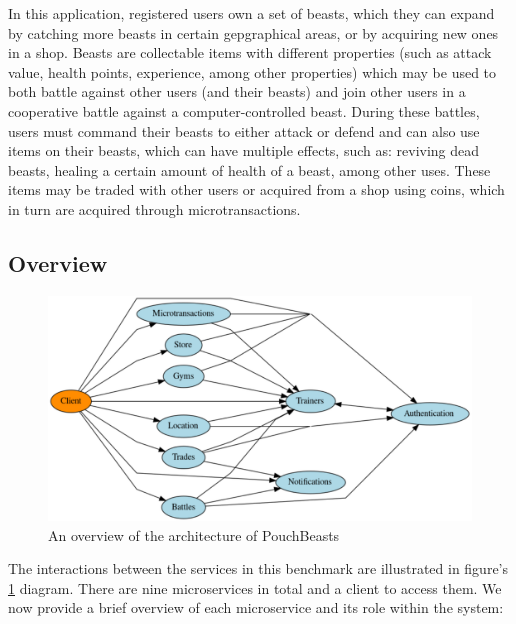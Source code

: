 In this application, registered users own a set of beasts, which they can expand by catching more beasts in certain gepgraphical areas, or by acquiring new ones in a shop. Beasts are collectable items with different properties (such as attack value, health points, experience, among other properties) which may be used to both battle against other users (and their beasts) and join other users in a cooperative battle against a computer-controlled beast. During these battles, users must command their beasts to either attack or defend and can also use items on their beasts, which can have multiple effects, such as: reviving dead beasts, healing a certain amount of health of a beast, among other uses. These items may be traded with other users or acquired from a shop using coins, which in turn are acquired through microtransactions.

\subsection{Overview}

\begin{figure}[htbp]
    \centering
    \includegraphics[width=\textwidth]{Chapters/benchmark/figures/interaction-diagram.pdf}
    \caption{An overview of the architecture of PouchBeasts}
    \label{fig:pouchbeasts-overview}
\end{figure}

The interactions between the services in this benchmark are illustrated in figure's \ref{fig:pouchbeasts-overview} diagram. There are nine microservices in total and a client to access them. We now provide a brief overview of each microservice and its role within the system:

